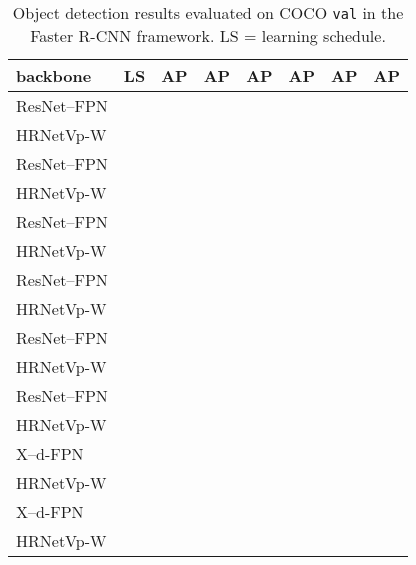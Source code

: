 \documentclass[10pt,twocolumn,letterpaper]{article}
\begin{document}
\renewcommand{\arraystretch}{1.3}
	\begin{table}[t]
	\setlength{\tabcolsep}{4.4pt}
	\scriptsize
	\centering
	\caption{Object detection results evaluated on COCO \texttt{val}
	in the Faster R-CNN framework.
	LS = learning schedule.}
	\label{tab:object_detection_fpn}
	\begin{tabular}{l|c|ccc|ccc}
		\hline \noalign{\smallskip}
		backbone & LS & AP & AP & AP & AP & AP & AP\\
		\hline
		
		\hline

	  	ResNet--FPN  &   &  &  &  &  &  &  \\
		HRNetVp-W &  &  &  &  &  &  &  \\
	    ResNet--FPN &   &  &  &  &  &  &  \\
		HRNetVp-W &  &  &  &  &  &  &  \\
	    \hline
	    ResNet--FPN &  &  &  &  &  &  &  \\
		HRNetVp-W &  &  &  &  &  &  &  \\
		ResNet--FPN &  &  &  &  &  &  &  \\
	    HRNetVp-W &  &  &  &  &  &  &   \\
	    \hline
	
	    ResNet--FPN &  &  &  &  &  &  &  \\
	    HRNetVp-W &  &  &  &  &  &  &   \\

	    ResNet--FPN &  &  &  &  &  &  &  \\

	    HRNetVp-W &  &  &  &  &  &  &   \\
	    \hline
	
	    X--d-FPN &  &  &  &  &  &  &  \\
	    HRNetVp-W &  &  &  &  &  &  &   \\
	    X--d-FPN &  &  &  &  &  &  &  \\
	    HRNetVp-W &  &  &  &  &  &  &   \\

	    \hline
	\end{tabular}
	\vspace{-1.5mm}
	\end{table}
\end{document}
